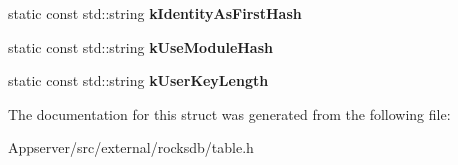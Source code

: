 \begin{DoxyCompactItemize}
\item 
static const std\+::string {\bfseries k\+Identity\+As\+First\+Hash}\hypertarget{structrocksdb_1_1CuckooTablePropertyNames_a0b59bf0c59b245cd1f31d83d27c11c65}{}\label{structrocksdb_1_1CuckooTablePropertyNames_a0b59bf0c59b245cd1f31d83d27c11c65}

\item 
static const std\+::string {\bfseries k\+Use\+Module\+Hash}\hypertarget{structrocksdb_1_1CuckooTablePropertyNames_aa00cabaf9a7cee4339b715b1a495fafb}{}\label{structrocksdb_1_1CuckooTablePropertyNames_aa00cabaf9a7cee4339b715b1a495fafb}

\item 
static const std\+::string {\bfseries k\+User\+Key\+Length}\hypertarget{structrocksdb_1_1CuckooTablePropertyNames_a9da1124e92125902c58cd7f78be7d488}{}\label{structrocksdb_1_1CuckooTablePropertyNames_a9da1124e92125902c58cd7f78be7d488}

\end{DoxyCompactItemize}


The documentation for this struct was generated from the following file\+:\begin{DoxyCompactItemize}
\item 
Appserver/src/external/rocksdb/table.\+h\end{DoxyCompactItemize}
